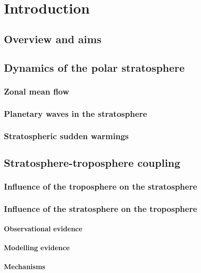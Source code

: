 \chapter{Introduction}
\label{cha:introduction}

\section{Overview and aims}

\section{Dynamics of the polar stratosphere}

\subsection{Zonal mean flow}
\subsection{Planetary waves in the stratosphere}
\subsection{Stratospheric sudden warmings}


\section{Stratosphere-troposphere coupling}

\subsection{Influence of the troposphere on the stratosphere}
\subsection{Influence of the stratosphere on the troposphere}
\subsubsection{Observational evidence}
\subsubsection{Modelling evidence}
\subsubsection{Mechanisms}

